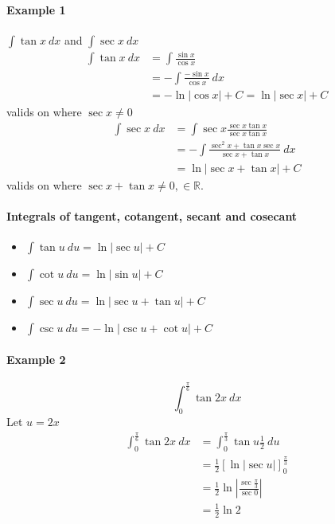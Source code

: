 \documentclass[12pt]{article}
\begin{document}
\paragraph{Example 1} $\int \tan x \: dx$ and $\int \sec x \: dx$
\begin{align*} 
     \int \tan x \: dx &= \int \frac{\sin x}{\cos x} \\
     &= - \int \frac{ - \sin x}{\cos x} \: dx \\
     &= - \ln |\cos x| + C = \ln |\sec x| + C
\end{align*}
valids on where $\sec x \neq 0$
\begin{align*} 
    \int \sec x \: dx &= \int \sec x \frac{\sec x \tan x}{\sec x \tan x}  \\
    &= - \int \frac{\sec^2 x + \tan x \sec x}{\sec x + \tan x} \: dx \\
    &= \ln |\sec x + \tan x| + C
\end{align*}
valids on where $\sec x + \tan x \neq 0, \in \mathbb{R}$.

\paragraph{Integrals of tangent, cotangent, secant and cosecant}
\begin{itemize} 
     \item $\int \tan u \: du = \ln |\sec u| + C$
     \item $\int \cot u \: du = \ln |\sin u| + C$
     \item $\int \sec u \: du = \ln |\sec u + \tan u| + C$
     \item $\int \csc u \: du = - \ln |\csc u + \cot u| + C$
\end{itemize}

\paragraph{Example 2}
\[
    \int_0^{\frac{\pi}{6}} \tan 2x \: dx
\]
Let $u = 2x$
\begin{align*} 
    \int_0^{\frac{\pi}{6}} \tan 2x \: dx &= \int_0^{\frac{\pi}{3}} \tan u \frac{1}{2} \: du \\
    &= \frac{1}{2} \left[ \ln |\sec u| \right]_0^{\frac{\pi}{3}} \\
    &= \frac{1}{2} \ln \left|\frac{\sec \frac{\pi}{3}}{\sec 0} \right| \\ 
    &= \frac{1}{2} \ln 2 
\end{align*}
\end{document}
